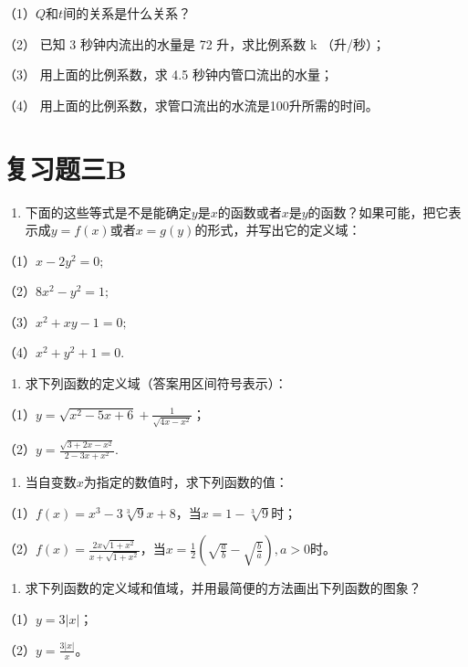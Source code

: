 （1）\(Q\)和\(t\)间的关系是什么关系？

（2） 已知 3 秒钟内流出的水量是 72 升，求比例系数 k （升/秒）；

（3） 用上面的比例系数，求 4.5 秒钟内管口流出的水量；

（4） 用上面的比例系数，求管口流出的水流是100升所需的时间。

\section{复习题三B}

\begin{enumerate}
\item
  下面的这些等式是不是能确定\(y\)是\(x\)的函数或者\(x\)是\(y\)的函数？如果可能，把它表示成\(y = f(x)\)或者\(x = g(y)\)的形式，并写出它的定义域：
\end{enumerate}

（1）\(x - 2y^{2} = 0;\)

（2）\(8x^{2} - y^{2} = 1;\)

（3）\(x^{2} + xy - 1 = 0;\)

（4）\(x^{2} + y^{2} + 1 = 0.\)

\begin{enumerate}[start=2]
\item
  求下列函数的定义域（答案用区间符号表示）：
\end{enumerate}

（1）\(y = \sqrt{x^2 - 5x + 6} + \frac{1}{\sqrt{4x - x^2}}\)；

（2）\(y = \frac{\sqrt{3 + 2x - x^2}}{2 - 3x + x^2}.\)

\begin{enumerate}[start=3]
\item
  当自变数\(x\)为指定的数值时，求下列函数的值：
\end{enumerate}

（1）\(f(x) = x^3 - 3\sqrt[3]{9}x + 8\)，当\(x = 1 - \sqrt[3]{9}\)时；

（2）\(f(x) = \frac{2x\sqrt{1 + x^2}}{x + \sqrt{1 + x^2}}\)，当\(x = \frac{1}{2}\left(\sqrt{\frac{a}{b}} - \sqrt{\frac{b}{a}}\right), a > 0\)时。

\begin{enumerate}[start=4]
\item
  求下列函数的定义域和值域，并用最简便的方法画出下列函数的图象？
\end{enumerate}

（1）\(y = 3|x|\)；

（2）\(y = \frac{3|x|}{x}\)。

